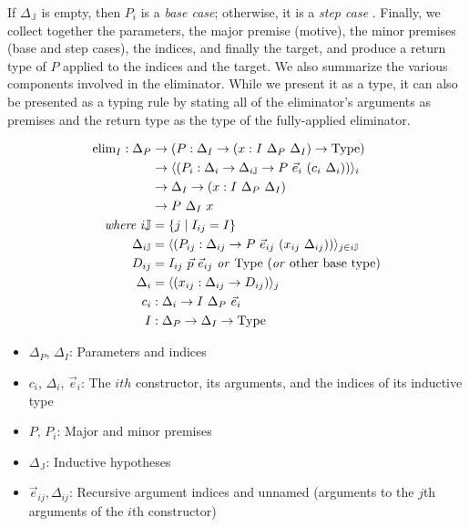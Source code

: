 \documentclass{report}
\newcommand{\const}[1]{\text{#1}}
\newcommand{\Type}{\const{Type}}
\begin{document}
If $\Delta_{\mathbb{J}}$ is empty, then $P_i$ is a \emph{base case}; otherwise, it is a \emph{step case} \citep{inductive-families}. Finally, we collect together the parameters, the major premise (motive), the minor premises (base and step cases), the indices, and finally the target, and produce a return type of $P$ applied to the indices and the target. We also summarize the various components involved in the eliminator. While we present it as a type, it can also be presented as a typing rule by stating all of the eliminator's arguments as premises and the return type as the type of the fully-applied eliminator.

\begin{align*}
    \const{elim}_I : \Delta_P &\to (P : \Delta_I \to (x : I ~ \Delta_P ~ \Delta_I) \to \Type) \\
    &\to \langle (P_i: \Delta_i \to \Delta_{i\mathbb{J}} \to P ~ \Vec{e}_i ~ (c_i ~ \Delta_i)) \rangle_i \\
    &\to \Delta_I \to (x: I ~ \Delta_P ~ \Delta_I) \\
    &\to P ~ \Delta_I ~ x \\
    \text{\emph{where}} ~ i\mathbb{J} &= \{ j \mid I_{ij} = I \} \\
    \Delta_{i\mathbb{J}} &= \langle (P_{ij} : \Delta_{ij} \to P ~ \Vec{e}_{ij} ~ (x_{ij} ~ \Delta_{ij})) \rangle_{j \in i\mathbb{J}} \\
    D_{ij} &= I_{ij} ~ \Vec{p} ~ \Vec{e}_{ij} ~ \text{\emph{or}} ~ \Type ~ (\text{\emph{or} other base type})\\
    \Delta_i &= \langle (x_{ij} : \Delta_{ij} \to D_{ij}) \rangle_j \\
    c_i &: \Delta_i \to I ~ \Delta_P ~ \Vec{e}_i \\
    I &: \Delta_P \to \Delta_I \to \Type
\end{align*}
%
\begin{itemize}
    \item $\Delta_P$, $\Delta_I$: Parameters and indices
    \item $c_i$, $\Delta_i$, $\Vec{e}_i$: The $ith$ constructor, its arguments, and the indices of its inductive type
    \item $P$, $P_i$: Major and minor premises
    \item $\Delta_{\mathbb{J}}$: Inductive hypotheses
    \item $\Vec{e}_{ij}, \Delta_{ij}$: Recursive argument indices and unnamed (arguments to the $j$th arguments of the $i$th constructor)
\end{itemize}
\end{document}

